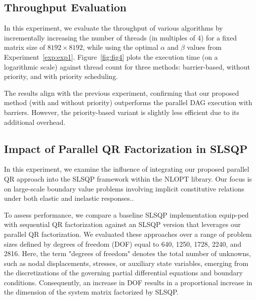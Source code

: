 \subsection{Throughput Evaluation} \label{exp:exp3}
In this experiment, we evaluate the throughput of various algorithms by incrementally increasing the number of threads (in multiples of 4) for a fixed matrix size of $8192 \times 8192$, while using the optimal $\alpha$ and $\beta$ values from Experiment~\ref{exp:exp1}. Figure~\ref{fig:fig4} plots the execution time (on a logarithmic scale) against thread count for three methods: barrier-based, without priority, and with priority scheduling.

The results align with the previous experiment, confirming that our proposed method (with and without priority) outperforms the parallel DAG execution with barriers. However, the priority-based variant is slightly less efficient due to its additional overhead.



\subsection{Impact of Parallel QR Factorization in SLSQP} \label{exp:exp4}

In this experiment, we examine the influence of integrating our proposed parallel QR approach into the SLSQP framework within the NLOPT library. Our focus is on large-scale boundary value problems involving implicit constitutive relations under both elastic and inelastic responses.\cite{ananthapadmanabhan2023multi}.

To assess performance, we compare a baseline SLSQP implementation equip-ped with sequential QR factorization against an SLSQP version that leverages our parallel QR factorization. We evaluated these approaches over a range of problem sizes defined by degrees of freedom (DOF) equal to 640, 1250, 1728, 2240, and 2816. Here, the term "degrees of freedom" denotes the total number of unknowns, such as nodal displacements, stresses, or auxiliary state variables, emerging from the discretizations of the governing partial differential equations and boundary conditions. Consequently, an increase in DOF results in a proportional increase in the dimension of the system matrix factorized by SLSQP.

